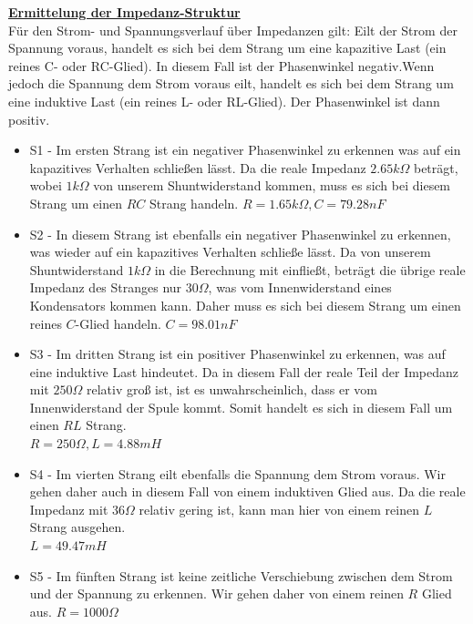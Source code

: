 \documentclass[a4paper,12pt]{article}
\begin{document}
	\noindent
	\underline{\textbf{Ermittelung der Impedanz-Struktur}}\\ \newline
	Für den Strom- und Spannungsverlauf über Impedanzen gilt:\newline
	Eilt der Strom der Spannung voraus, handelt es sich bei dem Strang um eine kapazitive Last (ein reines C- oder RC-Glied). In diesem Fall ist der Phasenwinkel negativ.\newline Wenn jedoch die Spannung dem Strom voraus eilt, handelt es sich bei dem Strang um eine induktive Last (ein reines L- oder RL-Glied). Der Phasenwinkel ist dann positiv.\\ \newline
	\begin{itemize}
		\item S1 - Im ersten Strang ist ein negativer Phasenwinkel zu erkennen was auf ein kapazitives Verhalten schließen lässt. Da die reale Impedanz $2.65k\Omega$ beträgt, wobei $1k\Omega$ von unserem Shuntwiderstand kommen, muss es sich bei diesem Strang um einen \(RC\) Strang handeln. 
		$R = 1.65k\Omega , C = 79.28nF$
		\item S2 - In diesem Strang ist ebenfalls ein negativer Phasenwinkel zu erkennen, was wieder auf ein kapazitives Verhalten schließe lässt. Da von unserem Shuntwiderstand $1k\Omega$ in die Berechnung mit einfließt, beträgt die übrige reale Impedanz des Stranges nur $30\Omega$, was vom Innenwiderstand eines Kondensators kommen kann. Daher muss es sich bei diesem Strang um einen reines \(C\)-Glied handeln. $C = 98.01nF$
		\item S3 - Im dritten Strang ist ein positiver Phasenwinkel zu erkennen, was auf eine induktive Last hindeutet. Da in diesem Fall der reale Teil der Impedanz mit $250\Omega$ relativ groß ist, ist es unwahrscheinlich, dass er vom Innenwiderstand der Spule kommt. Somit handelt es sich in diesem Fall um einen \(RL\) Strang. \\$R = 250\Omega , L = 4.88mH$
		\newpage
		\item S4 - Im vierten Strang eilt ebenfalls die Spannung dem Strom voraus. Wir gehen daher auch in diesem Fall von einem induktiven Glied aus. Da die reale Impedanz mit $36\Omega$ relativ gering ist, kann man hier von einem reinen \(L\) Strang ausgehen. \\
		$L = 49.47mH$
		\item S5 - Im fünften Strang ist keine zeitliche Verschiebung zwischen dem Strom und der Spannung zu erkennen. Wir gehen daher von einem reinen \(R\) Glied aus. $R = 1000\Omega$
	\end{itemize}
	\newpage
\end{document}
